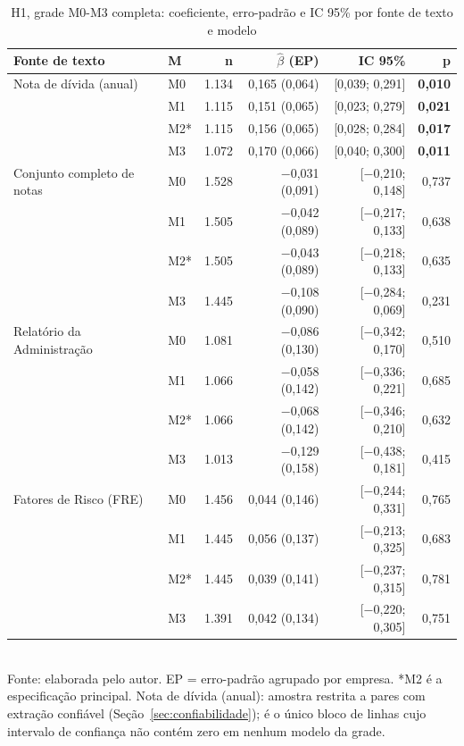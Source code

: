 \documentclass[a4paper,12pt]{report}
\begin{document}
\begin{table}[htbp]
    \centering
    \caption{H1, grade M0-M3 completa: coeficiente, erro-padrão e IC 95\% por fonte de texto e modelo}
    \label{tab:h1_m2_detalhe}
    \small
    \begin{tabular}{@{}llrrrr@{}}
        \toprule
        \textbf{Fonte de texto} & \textbf{M} & \textbf{n} & \textbf{$\hat\beta$ (EP)} & \textbf{IC 95\%} & \textbf{p} \\
        \midrule
        Nota de dívida (anual)      & M0 & 1.134 & 0,165 (0,064) & [0,039; 0,291] & \textbf{0,010} \\
                                     & M1 & 1.115 & 0,151 (0,065) & [0,023; 0,279] & \textbf{0,021} \\
                                     & M2* & 1.115 & 0,156 (0,065) & [0,028; 0,284] & \textbf{0,017} \\
                                     & M3 & 1.072 & 0,170 (0,066) & [0,040; 0,300] & \textbf{0,011} \\
        Conjunto completo de notas  & M0 & 1.528 & $-$0,031 (0,091) & [$-$0,210; 0,148] & 0,737 \\
                                     & M1 & 1.505 & $-$0,042 (0,089) & [$-$0,217; 0,133] & 0,638 \\
                                     & M2* & 1.505 & $-$0,043 (0,089) & [$-$0,218; 0,133] & 0,635 \\
                                     & M3 & 1.445 & $-$0,108 (0,090) & [$-$0,284; 0,069] & 0,231 \\
        Relatório da Administração  & M0 & 1.081 & $-$0,086 (0,130) & [$-$0,342; 0,170] & 0,510 \\
                                     & M1 & 1.066 & $-$0,058 (0,142) & [$-$0,336; 0,221] & 0,685 \\
                                     & M2* & 1.066 & $-$0,068 (0,142) & [$-$0,346; 0,210] & 0,632 \\
                                     & M3 & 1.013 & $-$0,129 (0,158) & [$-$0,438; 0,181] & 0,415 \\
        Fatores de Risco (FRE)      & M0 & 1.456 & 0,044 (0,146) & [$-$0,244; 0,331] & 0,765 \\
                                     & M1 & 1.445 & 0,056 (0,137) & [$-$0,213; 0,325] & 0,683 \\
                                     & M2* & 1.445 & 0,039 (0,141) & [$-$0,237; 0,315] & 0,781 \\
                                     & M3 & 1.391 & 0,042 (0,134) & [$-$0,220; 0,305] & 0,751 \\
        \bottomrule
    \end{tabular}
    \\[0.3cm]
    {\footnotesize Fonte: elaborada pelo autor. EP = erro-padrão agrupado por empresa. *M2 é a especificação principal. Nota de dívida (anual): amostra restrita a pares com extração confiável (Seção~\ref{sec:confiabilidade}); é o único bloco de linhas cujo intervalo de confiança não contém zero em nenhum modelo da grade.}
\end{table}
\end{document}
